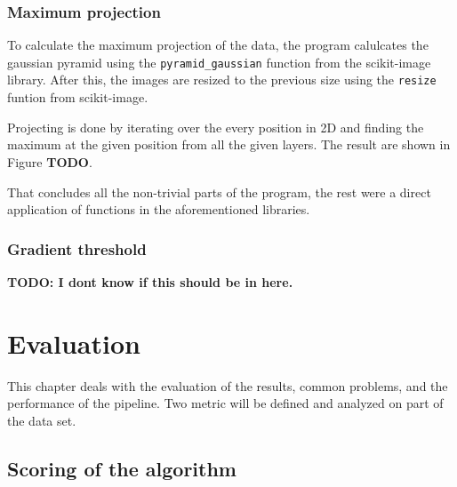 \documentclass[
  digital,     %
  oneside,     %
  nosansbold,  %
  nocolorbold, %
  lof,         %
  lot,         %
]{fithesis4}
\begin{document}
\subsection{Maximum projection} To calculate the maximum projection of the data,
the program calulcates the gaussian pyramid using the \texttt{pyramid\_gaussian}
function from the scikit-image library. After this, the images are resized to
the previous size using the \texttt{resize} funtion from scikit-image.

Projecting is done by iterating over the every position in 2D and finding the
maximum at the given position from all the given layers. The result are shown in
Figure \textbf{TODO}.

That concludes all the non-trivial parts of the program, the rest were a direct
application of functions in the aforementioned libraries.

\subsection{Gradient threshold}
\textbf{TODO: I dont know if this should be in here.}

\chapter{Evaluation}
This chapter deals with the evaluation of the results, common problems, and the
performance of the pipeline. Two metric will be defined and analyzed on part of
the data set.

\section{Scoring of the algorithm}
\end{document}
